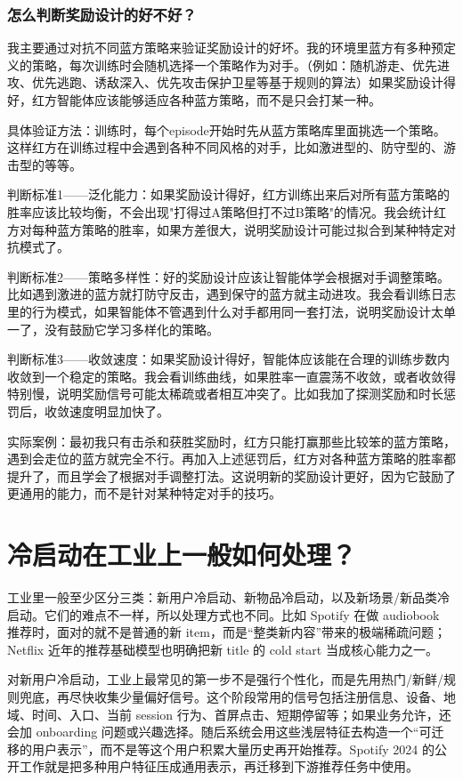 \documentclass[UTF8]{ctexart}
\begin{document}
\subsubsection{怎么判断奖励设计的好不好？}
我主要通过对抗不同蓝方策略来验证奖励设计的好坏。我的环境里蓝方有多种预定义的策略，每次训练时会随机选择一个策略作为对手。（例如：随机游走、优先进攻、优先逃跑、诱敌深入、优先攻击保护卫星等基于规则的算法）如果奖励设计得好，红方智能体应该能够适应各种蓝方策略，而不是只会打某一种。

具体验证方法：训练时，每个episode开始时先从蓝方策略库里面挑选一个策略。这样红方在训练过程中会遇到各种不同风格的对手，比如激进型的、防守型的、游击型的等等。

判断标准1——泛化能力：如果奖励设计得好，红方训练出来后对所有蓝方策略的胜率应该比较均衡，不会出现"打得过A策略但打不过B策略"的情况。我会统计红方对每种蓝方策略的胜率，如果方差很大，说明奖励设计可能过拟合到某种特定对抗模式了。

判断标准2——策略多样性：好的奖励设计应该让智能体学会根据对手调整策略。比如遇到激进的蓝方就打防守反击，遇到保守的蓝方就主动进攻。我会看训练日志里的行为模式，如果智能体不管遇到什么对手都用同一套打法，说明奖励设计太单一了，没有鼓励它学习多样化的策略。

判断标准3——收敛速度：如果奖励设计得好，智能体应该能在合理的训练步数内收敛到一个稳定的策略。我会看训练曲线，如果胜率一直震荡不收敛，或者收敛得特别慢，说明奖励信号可能太稀疏或者相互冲突了。比如我加了探测奖励和时长惩罚后，收敛速度明显加快了。

实际案例：最初我只有击杀和获胜奖励时，红方只能打赢那些比较笨的蓝方策略，遇到会走位的蓝方就完全不行。再加入上述惩罚后，红方对各种蓝方策略的胜率都提升了，而且学会了根据对手调整打法。这说明新的奖励设计更好，因为它鼓励了更通用的能力，而不是针对某种特定对手的技巧。

\section{冷启动在工业上一般如何处理？}
工业里一般至少区分三类：新用户冷启动、新物品冷启动，以及新场景/新品类冷启动。它们的难点不一样，所以处理方式也不同。比如 Spotify 在做 audiobook 推荐时，面对的就不是普通的新 item，而是“整类新内容”带来的极端稀疏问题；Netflix 近年的推荐基础模型也明确把新 title 的 cold start 当成核心能力之一。

对新用户冷启动，工业上最常见的第一步不是强行个性化，而是先用热门/新鲜/规则兜底，再尽快收集少量偏好信号。这个阶段常用的信号包括注册信息、设备、地域、时间、入口、当前 session 行为、首屏点击、短期停留等；如果业务允许，还会加 onboarding 问题或兴趣选择。随后系统会用这些浅层特征去构造一个“可迁移的用户表示”，而不是等这个用户积累大量历史再开始推荐。Spotify 2024 的公开工作就是把多种用户特征压成通用表示，再迁移到下游推荐任务中使用。
\end{document}
